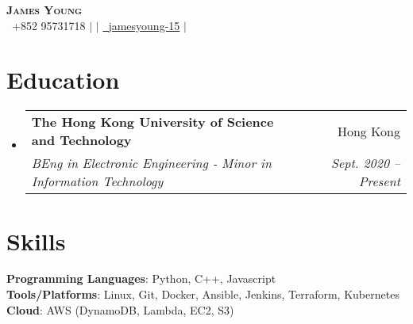 \documentclass[letterpaper,12pt]{article}
\makeatletter
\newcommand{\resumeSubheading}[4]{
  \vspace{-2pt}\item
    \begin{tabular*}{0.97\textwidth}[t]{l@{\extracolsep{\fill}}r}
      \textbf{#1} & #2 \\
      \textit{\small#3} & \textit{\small #4} \\
    \end{tabular*}\vspace{-7pt}
}
\newcommand{\resumeSubHeadingListStart}{\begin{itemize}[leftmargin=0.05in, label={}]}
\newcommand{\resumeSubHeadingListEnd}{\end{itemize}}
\makeatother
\begin{document}
\begin{center}
    \textbf{\Huge \scshape James Young} \\ \vspace{2pt}
    \small  \faPhone\ {+852 95731718} $|$ 
    \href{mailto:jyyoungaa@connect.ust.hk}{} $|$ 
    \href{https://github.com/jamesyoung-15} {\faGithub\ {jamesyoung-15}} $|$
    \href{https://linkedin.com/in/jamesyyoung}{}
\end{center}


\section{Education}
  \resumeSubHeadingListStart
    \resumeSubheading
      {The Hong Kong University of Science and Technology}{Hong Kong}
      {BEng in Electronic Engineering - Minor in Information Technology}{Sept. 2020 -- Present}
  \resumeSubHeadingListEnd


\section{Skills}
 \begin{itemize}[leftmargin=0.15in, label={}]
    \small{\item{
     \textbf{Programming Languages}{: Python, C++, Javascript} \\
     \textbf{Tools/Platforms}{: Linux, Git, Docker, Ansible, Jenkins, Terraform, Kubernetes} \\ 
     \textbf{Cloud}{: AWS (DynamoDB, Lambda, EC2, S3)} \\
    }}
 \end{itemize}
\end{document}
